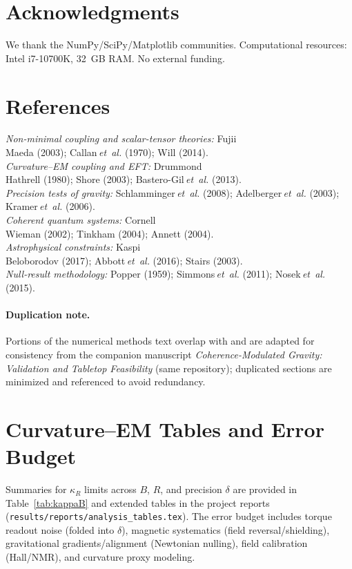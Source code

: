 \documentclass[10pt,twocolumn]{article}
\begin{document}
\section*{Acknowledgments}
We thank the NumPy/SciPy/Matplotlib communities. Computational resources: Intel i7-10700K, 32~GB RAM. No external funding.

\section*{References}
\noindent\textit{Non-minimal coupling and scalar-tensor theories:} Fujii \\ Maeda (2003); Callan\,\textit{et~al.} (1970); Will (2014).\\
\noindent\textit{Curvature--EM coupling and EFT:} Drummond \\ Hathrell (1980); Shore (2003); Bastero-Gil\,\textit{et~al.} (2013).\\
\noindent\textit{Precision tests of gravity:} Schlamminger\,\textit{et~al.} (2008); Adelberger\,\textit{et~al.} (2003); Kramer\,\textit{et~al.} (2006).\\
\noindent\textit{Coherent quantum systems:} Cornell \\ Wieman (2002); Tinkham (2004); Annett (2004).\\
\noindent\textit{Astrophysical constraints:} Kaspi \\ Beloborodov (2017); Abbott\,\textit{et~al.} (2016); Stairs (2003).\\
\noindent\textit{Null-result methodology:} Popper (1959); Simmons\,\textit{et~al.} (2011); Nosek\,\textit{et~al.} (2015).

\paragraph{Duplication note.} Portions of the numerical methods text overlap with and are adapted for consistency from the companion manuscript \emph{Coherence-Modulated Gravity: Validation and Tabletop Feasibility} (same repository); duplicated sections are minimized and referenced to avoid redundancy.

\appendix
\section{Curvature--EM Tables and Error Budget}
Summaries for $\kappa_R$ limits across $B$, $R$, and precision $\delta$ are provided in Table~\ref{tab:kappaB} and extended tables in the project reports (\texttt{results/reports/analysis\_tables.tex}). The error budget includes torque readout noise (folded into $\delta$), magnetic systematics (field reversal/shielding), gravitational gradients/alignment (Newtonian nulling), field calibration (Hall/NMR), and curvature proxy modeling.
\end{document}
